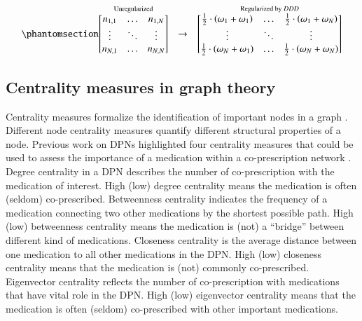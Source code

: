 \documentclass[
  authoryear,
  review]{elsarticle}
\begin{document}
\begin{equation}\phantomsection\label{eq-regularize-mtx}{
\stackrel{\textrm{Unregularized}}{
  \begin{bmatrix}
  n_{1, 1} & \dots & n_{1, N} \\
  \vdots & \ddots & \vdots \\
  n_{N, 1} & \dots & n_{N, N} \\
  \end{bmatrix}
}
\quad \to \quad
\stackrel{\textrm{Regularized by } DDD}{
  \begin{bmatrix}
  \frac{1}{2} \cdot \left(\omega_1 + \omega_1 \right) & \dots & \frac{1}{2} \cdot \left(\omega_1 + \omega_N \right) \\
  \vdots & \ddots & \vdots \\
  \frac{1}{2} \cdot \left(\omega_N + \omega_1 \right) & \dots & \frac{1}{2} \cdot \left(\omega_N + \omega_N \right) \\
  \end{bmatrix}
}
}\end{equation}

\subsection{Centrality measures in graph
theory}\label{centrality-measures-in-graph-theory}

Centrality measures formalize the identification of important nodes in a
graph \citep{estrada2012structure}. Different node centrality measures
quantify different structural properties of a node. Previous work on
DPNs highlighted four centrality measures that could be used to assess
the importance of a medication within a co-prescription network
\citep{Miglio2021}. Degree centrality in a DPN describes the number of
co-prescription with the medication of interest. High (low) degree
centrality means the medication is often (seldom) co-prescribed.
Betweenness centrality indicates the frequency of a medication
connecting two other medications by the shortest possible path. High
(low) betweenness centrality means the medication is (not) a ``bridge''
between different kind of medications. Closeness centrality is the
average distance between one medication to all other medications in the
DPN. High (low) closeness centrality means that the medication is (not)
commonly co-prescribed. Eigenvector centrality reflects the number of
co-prescription with medications that have vital role in the DPN. High
(low) eigenvector centrality means that the medication is often (seldom)
co-prescribed with other important medications.
\end{document}
